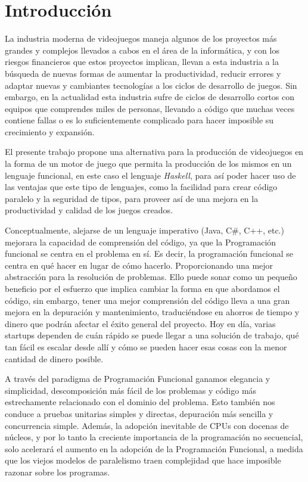 \chapter{Introducción}
\label{capitulo1}

La industria moderna de videojuegos maneja algunos de los proyectos más grandes y complejos llevados a cabos en el área de la informática, y con los riesgos financieros que estos proyectos implican, llevan a esta industria a la búsqueda de nuevas formas de aumentar la productividad, reducir errores y adaptar nuevas y cambiantes tecnologías a los ciclos de desarrollo de juegos. Sin embargo, en la actualidad esta industria sufre de ciclos de desarrollo cortos con equipos que comprendes miles de personas, llevando a código que muchas veces contiene fallas o es lo suficientemente complicado para hacer imposible su crecimiento y expansión.

El presente trabajo propone una alternativa para la producción de videojuegos en la forma de un motor de juego que permita la producción de los mismos en un lenguaje funcional, en este caso el lenguaje \emph{Haskell}, para así poder hacer uso de las ventajas que este tipo de lenguajes, como la facilidad para crear código paralelo y la seguridad de tipos, para proveer así de una mejora en la productividad y calidad de los juegos creados.

Conceptualmente, alejarse de un lenguaje imperativo (Java, C\#, C++, etc.) mejorara la capacidad de comprensión del código, ya que la Programación funcional se centra en el problema en sí. Es decir, la programación funcional se centra en qué hacer en lugar de cómo hacerlo. Proporcionando una mejor abstracción para la resolución de problemas. Ello puede sonar como un pequeño beneficio por el esfuerzo que implica cambiar la forma en que abordamos el código, sin embargo, tener una mejor comprensión del código lleva a una gran mejora en la depuración y mantenimiento, traduciéndose en ahorros de tiempo y dinero que podrán afectar el éxito general del proyecto. Hoy en día, varias startups dependen de cuán rápido se puede llegar a una solución de trabajo, qué tan fácil es escalar desde allí y cómo se pueden hacer esas cosas con la menor cantidad de dinero posible.

A través del paradigma de Programación Funcional ganamos elegancia y simplicidad, descomposición más fácil de los problemas y código más estrechamente relacionado con el dominio del problema. Esto también nos conduce a pruebas unitarias simples y directas, depuración más sencilla y concurrencia simple. Además, la adopción inevitable de CPUs con docenas de núcleos, y por lo tanto la creciente importancia de la programación no secuencial, solo acelerará el aumento en la adopción de la Programación Funcional, a medida que los viejos modelos de paralelismo traen complejidad que hace imposible razonar sobre los programas.

